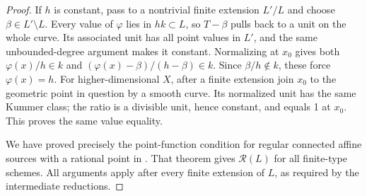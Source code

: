 \documentclass[11pt]{article}
\begin{document}
\begin{proof}
If \(h\) is constant, pass to a nontrivial finite extension
\(L'/L\) and choose \(\beta\in L'\setminus L\).
Every value of \(\varphi\) lies in \(hk\subset L\), so
\(T-\beta\) pulls back to a unit on the whole curve. Its
associated unit has all point values in \(L'\), and the same
unbounded-degree argument makes it constant. Normalizing at
\(x_0\) gives both
\(\varphi(x)/h\in k\) and
\((\varphi(x)-\beta)/(h-\beta)\in k\). Since \(\beta/h\notin k\),
these force \(\varphi(x)=h\). For higher-dimensional \(X\),
after a finite extension join \(x_0\) to the geometric point
in question by a smooth curve. Its normalized unit has the same
Kummer class; the ratio is a divisible unit, hence constant, and
equals 1 at \(x_0\). This proves the same value equality.

We have proved precisely the point-function condition for regular
connected affine sources with a rational point in
\citet[Theorem~4.18(5)]{FF_CHW2024}. That theorem gives
\(\mathcal R(L)\) for all finite-type schemes. All arguments
apply after every finite extension of \(L\), as required by the
intermediate reductions.
\end{proof}
\end{document}
